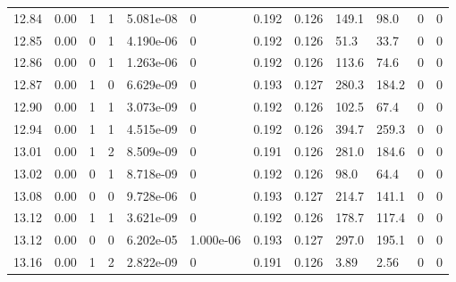 \documentclass[preview]{standalone}
\begin{document}
{{{{{{{{{\begin{tabular}{L{1.2cm}C{1.2cm} C{0.3cm}C{0.5cm} C{1.4cm}C{1.4cm} C{1.4cm}C{1.4cm} C{1.6cm}C{1.6cm} C{1.6cm}C{1.6cm}}
  12.84  &  0.00  & 1     &  1 &  5.081e-08  & 0  &  0.192&   0.126& 149.1 & 98.0   &  0 & 0  \\ 
  12.85  &  0.00  & 0     &  1 &  4.190e-06  & 0  &  0.192&   0.126& 51.3 & 33.7   &  0 & 0  \\ 
  12.86  &  0.00  & 0     &  1 &  1.263e-06  & 0  &  0.192&   0.126& 113.6 & 74.6   &  0 & 0  \\ 
  12.87  &  0.00  & 1     &  0 &  6.629e-09  & 0  &  0.193&   0.127& 280.3 & 184.2   &  0 & 0  \\ 
  12.90  &  0.00  & 1     &  1 &  3.073e-09  & 0  &  0.192&   0.126& 102.5 & 67.4   &  0 & 0  \\ 
  12.94  &  0.00  & 1     &  1 &  4.515e-09  & 0  &  0.192&   0.126& 394.7 & 259.3   &  0 & 0  \\ 
  13.01  &  0.00  & 1     &  2 &  8.509e-09  & 0  &  0.191&   0.126& 281.0 & 184.6   &  0 & 0  \\ 
  13.02  &  0.00  & 0     &  1 &  8.718e-09  & 0  &  0.192&   0.126& 98.0 & 64.4   &  0 & 0  \\ 
  13.08  &  0.00  & 0     &  0 &  9.728e-06  & 0  &  0.193&   0.127& 214.7 & 141.1   &  0 & 0  \\ 
  13.12  &  0.00  & 1     &  1 &  3.621e-09  & 0  &  0.192&   0.126& 178.7 & 117.4   &  0 & 0  \\ 
  13.12  &  0.00  & 0     &  0 &  6.202e-05  & 1.000e-06  &  0.193&   0.127& 297.0 & 195.1   &  0 & 0  \\ 
  13.16  &  0.00  & 1     &  2 &  2.822e-09  & 0  &  0.191&   0.126& 3.89 & 2.56   &  0 & 0  \\ 
\hline 
\end{tabular} 

}}}}}}}}}
\end{document}
